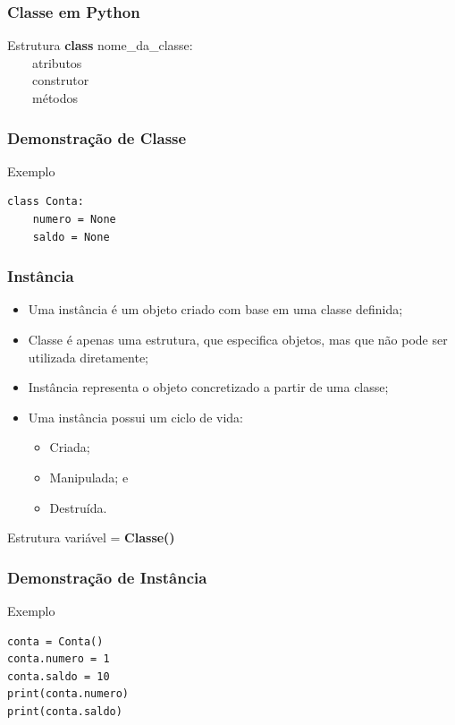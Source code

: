 \documentclass{beamer}
\begin{document}
\begin{frame}
	\frametitle{Classe em Python}
		
	\begin{block}{Estrutura}
		\textbf{class} nome\_da\_classe:\\
		~~~~atributos\\
		~~~~construtor\\
		~~~~métodos
	\end{block}
\end{frame}

\begin{frame}[fragile]
	\frametitle{Demonstração de Classe}
	
	\begin{exampleblock}{Exemplo}
		\begin{lstlisting}
class Conta:		
    numero = None
    saldo = None
		\end{lstlisting}
	\end{exampleblock}
\end{frame}

\begin{frame}
	\frametitle{Instância}
	
	\begin{itemize}
	  \item Uma instância é um objeto criado com base em uma classe definida;
	  \item Classe é apenas uma estrutura, que especifica objetos, mas que não
	  pode ser utilizada diretamente;
	  \item Instância representa o objeto concretizado a partir de uma classe;
	  \item Uma instância possui um ciclo de vida:
	  \begin{itemize}
	    \item Criada;
	    \item Manipulada; e
	    \item Destruída. 
	  \end{itemize}
	\end{itemize} \vfill
	
	\begin{block}{Estrutura}
		variável = \textbf{Classe()}
	\end{block}
\end{frame}

\begin{frame}[fragile]
	\frametitle{Demonstração de Instância}
	
	\begin{exampleblock}{Exemplo}
		\begin{lstlisting}
conta = Conta()
conta.numero = 1
conta.saldo = 10
print(conta.numero)
print(conta.saldo)
        \end{lstlisting}
	\end{exampleblock}
\end{frame}
\end{document}
